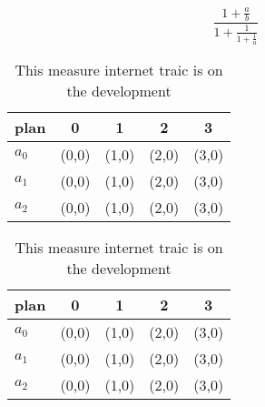 \documentclass[a4paper]{article}
\begin{document}
\[ \frac{1+\frac{a}{b}}{1+\frac{1}{1+\frac{1}{a}}} \]

\begin{table}
\begin{adjustbox}{width=0.6\columnwidth}
\begin{tabular}{|l|l|l|l|l|}
\hline
\textbf{plan} & \multicolumn{1}{c|}{\textbf{0}} & \multicolumn{1}{c|}{\textbf{1}} & \multicolumn{1}{c|}{\textbf{2}} & \multicolumn{1}{c|}{\textbf{3}} \\ \hline
\textbf{$a_0$}  & (0,0) & (1,0) & (2,0) & (3,0) \\ \hline
\textbf{$a_1$}  & (0,0) & (1,0) & (2,0) & (3,0) \\ \hline
\textbf{$a_2$}  & (0,0) & (1,0) & (2,0) & (3,0) \\ \hline
\end{tabular}
\end{adjustbox}
\caption{This measure internet traic is on the development
}
\end{table}

\begin{table}
\begin{adjustbox}{width=0.6\columnwidth}
\begin{tabular}{|l|l|l|l|l|}
\hline
\textbf{plan} & \multicolumn{1}{c|}{\textbf{0}} & \multicolumn{1}{c|}{\textbf{1}} & \multicolumn{1}{c|}{\textbf{2}} & \multicolumn{1}{c|}{\textbf{3}} \\ \hline
\textbf{$a_0$}  & (0,0) & (1,0) & (2,0) & (3,0) \\ \hline
\textbf{$a_1$}  & (0,0) & (1,0) & (2,0) & (3,0) \\ \hline
\textbf{$a_2$}  & (0,0) & (1,0) & (2,0) & (3,0) \\ \hline
\end{tabular}
\end{adjustbox}
\caption{This measure internet traic is on the development
}
\end{table}
\end{document}

